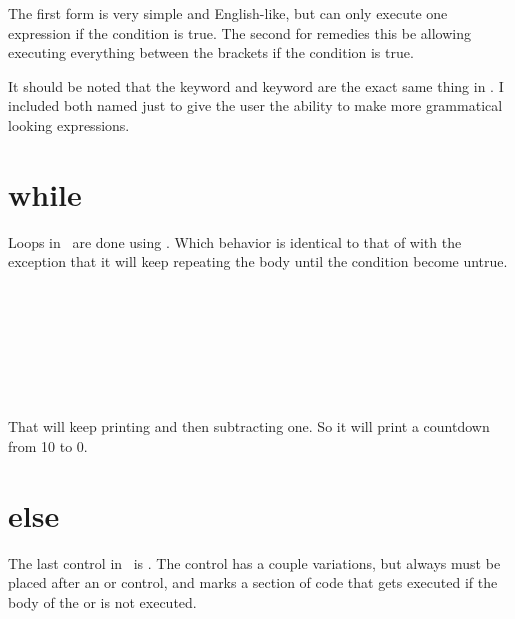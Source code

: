 The first form is very simple and English-like, but can only execute one expression if the condition is true.  The second for remedies this be allowing executing everything between the brackets if the condition is true.

It should be noted that the  keyword and  keyword are the exact same thing in \SSquared{}.  I included both named just to give the user the ability to make more grammatical looking expressions.




\section{while}

Loops in \SSquared\ are done using .  Which behavior is identical to that of  with the exception that it will keep repeating the body until the condition become untrue.

\begin{SSCodeBox}
\scitea{;} \\
\scitel{} \\
\scitea{\{} \\
\scitea{\hspace*{4em}}
 \\
\scitea{\hspace*{4em}}
 \\
\scitea{;} \\
\scitea{\}}
\end{SSCodeBox}

That will keep printing  and then subtracting one.  So it will print a countdown from 10 to 0.


\section{else}

The last control in \SSquared\ is .  The  control has a couple variations, but always must be placed after an  or  control, and marks a section of code that gets executed if the body of the  or  is not executed.

\begin{SSCodeBox}
 \\
\scitea{ }
\end{SSCodeBox}

